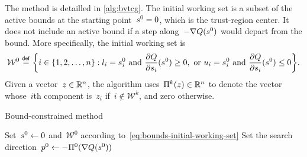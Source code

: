 The method is detailled in \cref{alg:bvtcg}.
The initial working set is a subset of the active bounds at the starting point~$\sstep[0] = 0$, which is the trust-region center.
It does not include an active bound if a step along~$-\nabla Q(\sstep[0])$ would depart from the bound.
More specifically, the initial working set is
\begin{equation}
    \label{eq:bounds-initial-working-set}
    \mathcal{W}^0 \eqdef \set[\bigg]{i \in \set{1, 2, \dots, n} : \xl_i = \sstep[0]_i ~ \text{and} ~ \frac{\partial Q}{\partial \sstep_i}(\sstep[0]) \ge 0, ~ \text{or} ~ \xu_i = \sstep[0]_i ~ \text{and} ~ \frac{\partial Q}{\partial \sstep_i}(\sstep[0]) \le 0}.
\end{equation}
Given a vector~$z \in \mathbb{R}^n$, the algorithm uses~$\Pi^k(z) \in \mathbb{R}^n$ to denote the vector whose~$i$th component is~$z_i$ if~$i \notin \mathcal{W}^k$, and zero otherwise.

\begin{algorithm}
    \caption[Bound-constrained  method]{Bound-constrained  method~\cite[\S~3]{Powell_2009}}
    \label{alg:bvtcg}
    \DontPrintSemicolon
    \onehalfspacing
    Set~$\sstep[0] \gets 0$ and~$\mathcal{W}^0$ according to~\cref{eq:bounds-initial-working-set}\;
    Set the search direction~$\pstep[0] \gets -\Pi^0(\nabla Q(\sstep[0]))$\;
\end{algorithm}

